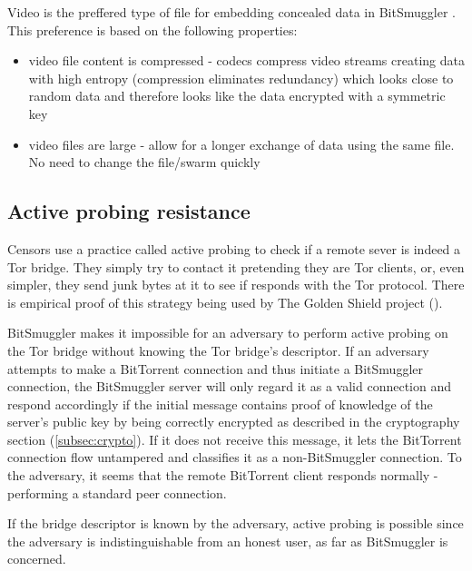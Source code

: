 \documentclass[11pt]{book} %
\newcommand{\projectName}{BitSmuggler }
\begin{document}
Video is the preffered type of file for embedding concealed data in \projectName. This preference is based on the following properties:
\begin{itemize}
\item video file content is compressed - codecs compress video streams creating data with high entropy (compression eliminates redundancy) which looks close to random data and therefore looks like the data encrypted with a symmetric key
\item video files are large - allow for a longer exchange of data using the same file. No need to change the file/swarm quickly

\end{itemize}

\label{subsec:steganography}


\subsection{Active probing resistance}
\label{subsec:activeProbingResist}

Censors use a practice called active probing to check if  a remote sever is indeed a Tor bridge. They simply try to contact it pretending they are Tor clients, or, even simpler, they send junk bytes at it to see if responds with the Tor protocol. There is empirical proof of this strategy being used by The Golden Shield project (\citep*{web:bridgeKnock}).

\projectName makes it impossible for an adversary to perform active probing on the Tor bridge without knowing the Tor bridge's descriptor. If an adversary attempts to make a BitTorrent connection and thus initiate a \projectName connection, the \projectName server will only regard it as a valid connection and respond accordingly if the initial message contains proof of knowledge of the server's public key by being correctly encrypted as described in the cryptography section (\ref{subsec:crypto}).  If it does not receive this message, it lets the BitTorrent connection flow untampered and classifies it as a non-\projectName connection. To the adversary, it seems that the remote BitTorrent client responds normally - performing a standard peer connection. 

If the bridge descriptor is known by the adversary, active probing is possible since the adversary is indistinguishable from an honest user, as far as BitSmuggler is concerned.
\end{document}
